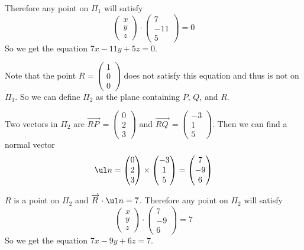 \documentclass[a4paper]{article}
\begin{document}
Therefore any point on $\Pi_1$ will satisfy \[
\begin{pmatrix}x \\ y \\ z\end{pmatrix} \cdot \begin{pmatrix}7 \\ -11 \\ 5\end{pmatrix} = 0
\] So we get the equation $7x - 11y + 5z = 0$.

Note that the point $R = \begin{pmatrix}1 \\ 0 \\ 0\end{pmatrix}$ does not satisfy this equation and thus is not on $\Pi_1$. So we can define $\Pi_2$ as the plane containing $P$, $Q$, and $R$.

Two vectors in $\Pi_2$ are $\overrightarrow{RP\,} = \begin{pmatrix}0 \\ 2 \\ 3\end{pmatrix}$ and $\overrightarrow{RQ\,} = \begin{pmatrix}-3 \\ 1 \\ 5\end{pmatrix}$. Then we can find a normal vector \[
\ul n = \begin{pmatrix}0 \\ 2 \\ 3\end{pmatrix}
\times \begin{pmatrix}-3 \\ 1 \\ 5\end{pmatrix}
= \begin{pmatrix}7 \\ -9 \\ 6\end{pmatrix}
\]

$R$ is a point on $\Pi_2$ and $\overrightarrow{R\,} \cdot \ul n = 7$. Therefore any point on $\Pi_2$ will satisfy \[
\begin{pmatrix}x \\ y \\ z\end{pmatrix} \cdot \begin{pmatrix}7 \\ -9 \\ 6\end{pmatrix} = 7
\] So we get the equation $7x - 9y + 6z = 7$.
\end{document}
